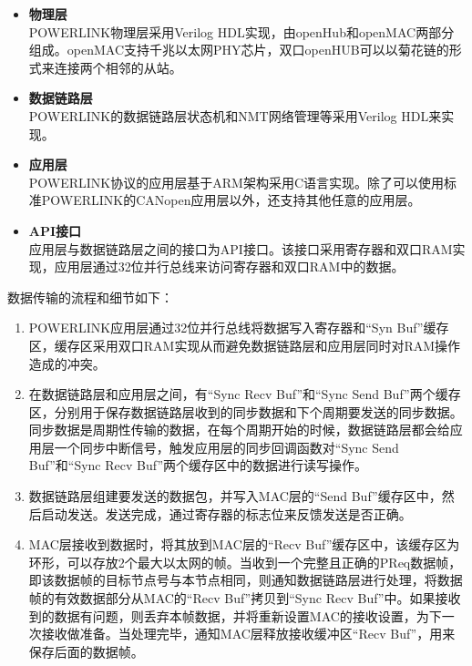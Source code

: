 \begin{itemize}

\item \textbf{物理层} \\ 
POWERLINK物理层采用Verilog HDL实现，由openHub和openMAC两部分组成。openMAC支持千兆以太网PHY芯片，双口openHUB可以以菊花链的形式来连接两个相邻的从站。 

\item \textbf{数据链路层} \\ 
POWERLINK的数据链路层状态机和NMT网络管理等采用Verilog HDL来实现。

\item \textbf{应用层} \\ 
POWERLINK协议的应用层基于ARM架构采用C语言实现。除了可以使用标准POWERLINK的CANopen应用层以外，还支持其他任意的应用层。

\item \textbf{API接口} \\ 
应用层与数据链路层之间的接口为API接口。该接口采用寄存器和双口RAM实现，应用层通过32位并行总线来访问寄存器和双口RAM中的数据。

\end{itemize}

数据传输的流程和细节如下：

\begin{enumerate}
  \item POWERLINK应用层通过32位并行总线将数据写入寄存器和“Syn Buf”缓存区，缓存区采用双口RAM实现从而避免数据链路层和应用层同时对RAM操作造成的冲突。

  \item 在数据链路层和应用层之间，有“Sync Recv Buf”和“Sync Send Buf”两个缓存区，分别用于保存数据链路层收到的同步数据和下个周期要发送的同步数据。同步数据是周期性传输的数据，在每个周期开始的时候，数据链路层都会给应用层一个同步中断信号，触发应用层的同步回调函数对“Sync Send Buf”和“Sync Recv Buf”两个缓存区中的数据进行读写操作。

  \item 数据链路层组建要发送的数据包，并写入MAC层的“Send Buf”缓存区中，然后启动发送。发送完成，通过寄存器的标志位来反馈发送是否正确。

  \item MAC层接收到数据时，将其放到MAC层的“Recv Buf”缓存区中，该缓存区为环形，可以存放2个最大以太网的帧。当收到一个完整且正确的PReq数据帧，即该数据帧的目标节点号与本节点相同，则通知数据链路层进行处理，将数据帧的有效数据部分从MAC的“Recv Buf”拷贝到“Sync Recv Buf”中。如果接收到的数据有问题，则丢弃本帧数据，并将重新设置MAC的接收设置，为下一次接收做准备。当处理完毕，通知MAC层释放接收缓冲区“Recv Buf”，用来保存后面的数据帧。
 
\end{enumerate}

